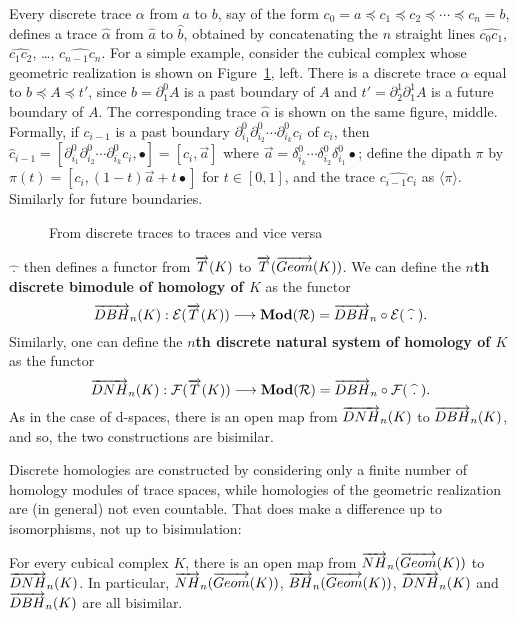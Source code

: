 Every discrete trace $\alpha$ from $a$ to $b$, say of the form $c_0 =
a \preceq c_1 \preceq c_2 \preceq \cdots \preceq c_n = b$, defines a
trace $\hat\alpha$ from $\hat a$ to $\hat b$, obtained by
concatenating the $n$ straight lines $\widehat {c_0 c_1}$, $\widehat
{c_1 c_2}$, \ldots, $\widehat {c_{n-1} c_n}$.  For a simple example,
consider the cubical complex whose geometric realization is shown on
Figure~\ref{fig:hat}, left.  There is a discrete trace $\alpha$ equal
to $b \preceq A \preceq t'$, since $b = \partial_1^0 A$ is a past
boundary of $A$ and $t' = \partial_2^1 \partial_1^1 A$ is a future
boundary of $A$.  The corresponding trace $\hat\alpha$ is shown on the
same figure, middle.  Formally, if $c_{i-1}$ is a past boundary
$\partial_{i_1}^0 \partial_{i_2}^0 \cdots \partial_{i_k}^0 c_i$ of
$c_i$, then $\hat c_{i-1} = [\partial_{i_1}^0 \partial_{i_2}^0
\cdots \partial_{i_k}^0 c_i, \bullet] = [c_i, \vec a]$ where $\vec a =
\delta_{i_k}^0 \cdots \delta_{i_2}^0 \delta_{i_1}^0 \bullet$; define
the dipath $\pi$ by $\pi (t) = [c_i, (1-t) \vec a + t \bullet]$ for $t
\in [0, 1]$, and the trace $\widehat {c_{i-1} c_i}$ as $\langle \pi
\rangle$.  Similarly for future boundaries.

\begin{figure}[H]
  \centering
    		
  \caption{From discrete traces to traces and vice versa}
  \label{fig:hat}
\end{figure}

$\widehat{~.~}$ then defines a functor from $\overrightarrow{T}(K)$ to $\overrightarrow{T}(\overrightarrow{Geom}(K))$. We can define the \textbf{$n$th discrete bimodule of homology of $K$} as the functor 
$$\overrightarrow{DBH}_{n}(K) : \mathcal{E}(\overrightarrow{T}(K)) \longrightarrow \textbf{Mod}(\mathcal{R}) = \overrightarrow{DBH}_{n}\circ\mathcal{E}(\widehat{~.~}).$$
Similarly, one can define the \textbf{$n$th discrete natural system of homology of $K$} as the functor
$$\overrightarrow{DNH}_{n}(K) : \mathcal{F}(\overrightarrow{T}(K)) \longrightarrow \textbf{Mod}(\mathcal{R}) = \overrightarrow{DBH}_{n}\circ\mathcal{F}(\widehat{~.~}).$$
As in the case of d-spaces, there is an open map from $\overrightarrow{DNH}_{n}(K)$ to $\overrightarrow{DBH}_{n}(K)$, and so, the two constructions are bisimilar.

Discrete homologies are constructed by considering only a finite number of homology modules of trace spaces, while homologies of the geometric realization are (in general) not even countable. That does make a difference up to isomorphisms, not up to bisimulation:

\begin{theo}
\noindent For every cubical complex $K$, there is an open map from $\overrightarrow{NH}_{n}(\overrightarrow{Geom}(K))$ to $\overrightarrow{DNH}_{n}(K)$.  In particular, $\overrightarrow{NH}_{n}(\overrightarrow{Geom}(K))$, $\overrightarrow{BH}_{n}(\overrightarrow{Geom}(K))$, $\overrightarrow{DNH}_{n}(K)$ and $\overrightarrow{DBH}_{n}(K)$ are all bisimilar.
\end{theo}

